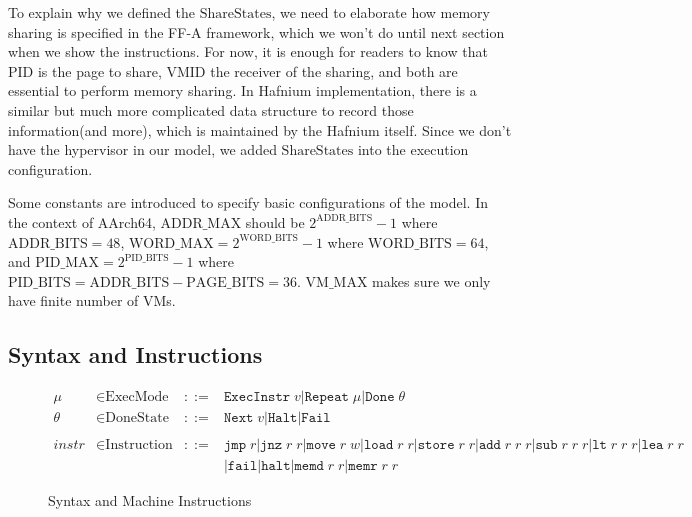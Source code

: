 \documentclass[a4paper]{article}
\newcommand*{\derived}{::=}
\newcommand*{\SSS}{\text{ShareStates}}
\newcommand*{\PID}{\text{PID}}
\newcommand*{\VMID}{\text{VMID}}
\newcommand*{\MODE}{\text{ExecMode}}
\newcommand*{\DONE}{\text{DoneState}}
\newcommand*{\INSTR}{\text{Instruction}}
\newcommand*{\PABITS}{\text{ADDR\_BITS}}
\newcommand*{\PPBITS}{\text{PAGE\_BITS}}
\newcommand*{\PPIDBITS}{\text{PID\_BITS}}
\newcommand*{\PAMAX}{\text{ADDR\_MAX}}
\newcommand*{\PPIDMAX}{\text{PID\_MAX}}
\newcommand*{\PWBITS}{\text{WORD\_BITS}}
\newcommand*{\PWMAX}{\text{WORD\_MAX}}
\newcommand*{\PVMMAX}{\text{VM\_MAX}}
\newcommand*{\instrm}[1]{\mathtt{#1}}
\newcommand*{\NXT}[1]{\mathtt{Next} \; {#1}}
\begin{document}
To explain why we defined the $\SSS$, we need to elaborate how memory sharing is specified in the FF-A framework, which we won't do until next section when we show the instructions. For now, it is enough for readers to know that $\PID$ is the page to share, $\VMID$ the receiver of the sharing, and both are essential to perform memory sharing. In Hafnium implementation, there is a similar but much more complicated data structure to record those information(and more), which is maintained by the Hafnium itself. Since we don't have the hypervisor in our model, we added $\SSS$ into the execution configuration.

Some constants are introduced to specify basic configurations of the model. In the context of AArch64, $\PAMAX$ should be $2^{\PABITS} - 1$ where $\PABITS = 48$, $\PWMAX = 2^{\PWBITS} -1$ where $\PWBITS = 64$, and $\PPIDMAX = 2^{\PPIDBITS}-1$ where $\PPIDBITS = \PABITS - \PPBITS = 36$. $\PVMMAX$ makes sure we only have finite number of VMs.





\subsection{Syntax and Instructions}
\begin{figure}
\begin{align*}
  \mu &\in \MODE &\derived & \mathtt{ExecInstr} \; v | \mathtt{Repeat} \; \mu | \mathtt{Done} \; \theta \\
  \theta &\in \DONE &\derived & \NXT{v} | \mathtt{Halt} | \mathtt{Fail}\\
  \\
  instr & \in  \INSTR &\derived & \instrm{jmp} \; r | \instrm{jnz} \; r \; r | \instrm{move} \; r \; w | \instrm{load} \; r\; r | \instrm{store} \; r \; r | \instrm{add} \; r \; r \; r | \instrm{sub} \; r \; r \; r | \instrm{lt} \; r \; r \; r | \instrm{lea} \; r \; r \\
  & & & | \instrm{fail} | \instrm{halt} | \instrm{memd} \; r \; r | \instrm{memr} \; r\; r
\end{align*}
\caption{Syntax and Machine Instructions}
\end{figure}

\end{document}
